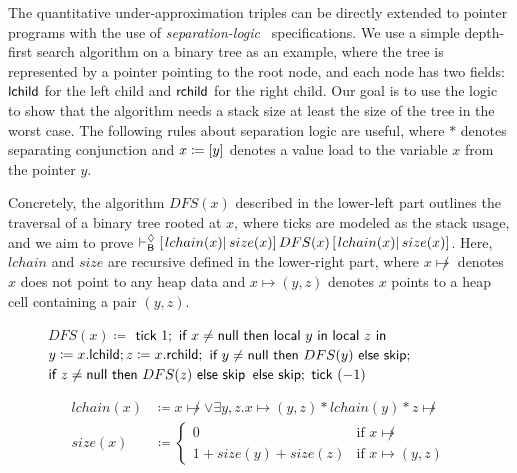 The quantitative under-approximation triples can be directly extended to pointer programs with the use of \emph{separation-logic}~\cite{POPL:IO01,LICS:Reynolds02} specifications.
We use a simple depth-first search algorithm on a binary tree as an example, where the tree is represented by a pointer pointing to the root node, and each node has two fields: $\mathsf{lchild}$ for the left child and $\mathsf{rchild}$ for the right child.
Our goal is to use the \QBUAd logic to show that the algorithm needs a stack size at least the size of the tree in the worst case.
The following rules about separation logic are useful, where $\ast$ denotes separating conjunction and $x\coloneqq[y]$ denotes a value load to the variable $x$ from the pointer $y$.

Concretely, the algorithm $DFS(x)$ described in the lower-left part outlines the traversal of a binary tree rooted at $x$, where ticks are modeled as the stack usage, and we aim to prove $\vdash^{\Diamond}_{\mathsf{B}}\left[\left.lchain(x)\right|size(x)\right]DFS(x)\left[\left.lchain(x)\right|size(x)\right]$.
Here, $lchain$ and $size$ are recursive defined in the lower-right part, where $x \not\mapsto$ denotes $x$ does not point to any heap data and $x \mapsto (y,z)$ denotes $x$ points to a heap cell containing a pair $(y,z)$.
\begin{figure}[H]\small
\begin{minipage}[t]{0.45\textwidth}
\begin{algorithmic}[1]
  \State $DFS(x)\coloneqq$
  \Indent
  \State $\textsf{tick}~1;$
  \State $\textsf{if}~x\ne\mathsf{null}~\textsf{then}~\textsf{local}~y~\textsf{in}~\textsf{local}~z~\textsf{in}$
  \Indent
  \State $y\coloneqq x.\mathsf{lchild};z\coloneqq x.\mathsf{rchild};$
  \State $\textsf{if}~y\ne\mathsf{null}~\textsf{then}~DFS(y)~\textsf{else}~\textsf{skip};$
  \State $\textsf{if}~z\ne\mathsf{null}~\textsf{then}~DFS(z)~\textsf{else}~\textsf{skip}$
  \EndIndent
  \State $\mathsf{else}~\textsf{skip};$
  \State $\textsf{tick}~(-1)$
  \EndIndent
\end{algorithmic}
\end{minipage}
\hspace{-1.5em}
\begin{minipage}[t]{0.45\textwidth}
\begin{align*}
  lchain(x)&\coloneqq x\not\mapsto\lor\exists y,z.x\mapsto(y,z)*lchain(y)*z\not\mapsto\\
  size(x)&\coloneqq\begin{cases}0&\text{if }x\not\mapsto\\1+size(y)+size(z)&\text{if }x\mapsto(y,z)\end{cases}
\end{align*}
\end{minipage}
\end{figure}

